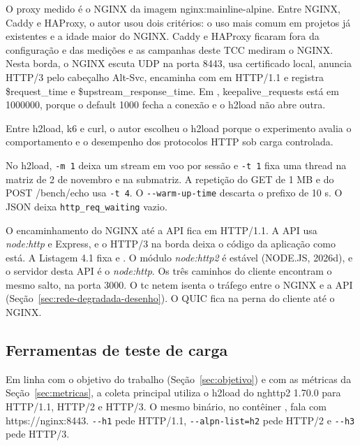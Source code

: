 O proxy medido é o NGINX da imagem nginx:mainline-alpine. Entre NGINX, Caddy e HAProxy, o autor usou dois critérios: o uso mais comum em projetos já existentes e a idade maior do NGINX. Caddy e HAProxy ficaram fora da configuração e das medições e as campanhas deste TCC mediram o NGINX. Nesta borda, o NGINX escuta UDP na porta 8443, usa certificado local, anuncia HTTP/3 pelo cabeçalho Alt-Svc, encaminha com  em HTTP/1.1 e registra \$request\_time e \$upstream\_response\_time. Em , keepalive\_requests está em 1000000, porque o default 1000 fecha a conexão e o h2load não abre outra.

Entre h2load, k6 e curl, o autor escolheu o h2load porque o experimento avalia o comportamento e o desempenho dos protocolos HTTP sob carga controlada.

No h2load, \texttt{-m 1} deixa um stream em voo por sessão e \texttt{-t 1} fixa uma thread na matriz de 2 de novembro e na submatriz. A repetição do GET de 1 MB e do POST /bench/echo usa \texttt{-t 4}. O \texttt{-{}-warm-up-time} descarta o prefixo de 10 s. O JSON deixa \texttt{http\_req\_waiting} vazio.

O encaminhamento do NGINX até a API fica em HTTP/1.1. A API usa \textit{node:http} e Express, e o HTTP/3 na borda deixa o código da aplicação como está. A Listagem 4.1 fixa  e . O módulo \textit{node:http2} é estável (NODE.JS, 2026d), e o servidor desta API é o \textit{node:http}. Os três caminhos do cliente encontram o mesmo salto, na porta 3000. O tc netem isenta o tráfego entre o NGINX e a API (Seção~\ref{sec:rede-degradada-desenho}). O QUIC fica na perna do cliente até o NGINX.

\subsection{Ferramentas de teste de carga}

Em linha com o objetivo do trabalho (Seção~\ref{sec:objetivo}) e com as métricas da Seção~\ref{sec:metricas}, a coleta principal utiliza o h2load do nghttp2 1.70.0 para HTTP/1.1, HTTP/2 e HTTP/3. O mesmo binário, no contêiner , fala com https://nginx:8443. \texttt{-{}-h1} pede HTTP/1.1, \texttt{-{}-alpn-list=h2} pede HTTP/2 e \texttt{-{}-h3} pede HTTP/3.

